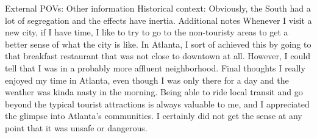 \documentclass{article}
\begin{document}
\begin{outline}
            \2 External POVs:
        \1 Other information 
            \2 Historical context:
                \3 Obviously, the South had a lot of segregation and the effects have inertia. 
            \2 Additional notes 
                \3 Whenever I visit a new city, if I have time, I like to try to go to the non-touristy areas to get a better sense of what the city is like. In Atlanta, I sort of achieved this by going to that breakfast restaurant that was not close to downtown at all. However, I could tell that I was in a probably more affluent neighborhood. 
            \2 Final thoughts
                \3 I really enjoyed my time in Atlanta, even though I was only there for a day and the weather was kinda nasty in the morning. Being able to ride local transit and go beyond the typical tourist attractions is always valuable to me, and I appreciated the glimpse into Atlanta's communities. I certainly did not get the sense at any point that it was unsafe or dangerous. 

    \end{outline}
\end{document}
